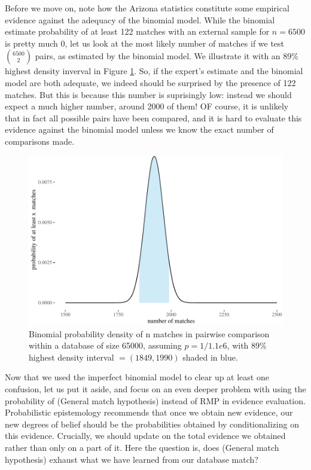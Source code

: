 \documentclass[10pt,dvipsnames,enabledeprecatedfontcommands]{scrartcl}
\begin{document}

Before we move on, note how the Arizona statistics constitute some
empirical evidence against the adequacy of the binomial model. While the
binomial estimate probability of at least 122 matches with an external
sample for \(n=6500\) is pretty much 0, let us look at the most likely
number of matches if we test \({6500 \choose 2}\) pairs, as estimated by
the binomial model. We illustrate it with an 89\% highest density
inverval in Figure \ref{fig:ArizonaDensity}. So, if the expert's
estimate and the binomial model are both adequate, we indeed should be
surprised by the presence of 122 matches. But this is because this
number is suprisingly low: instead we should expect a much higher
number, around 2000 of them! OF course, it is unlikely that in fact all
possible pairs have been compared, and it is hard to evaluate this
evidence against the binomial model unless we know the exact number of
comparisons made.

\begin{figure}[h]

\begin{center}\includegraphics[width=1\linewidth]{lr-chapter3_files/figure-latex/fig:ArizonaDensity-1} \end{center}
\caption{Binomial probability density of  n matches in pairwise comparison within a database of size 65000, assuming $p=1/1.1e6$, with 89\% highest density interval $=(1849,1990)$ shaded in blue.}
\label{fig:ArizonaDensity}
\end{figure}

Now that we used the imperfect binomial model to clear up at least one
confusion, let us put it aside, and focus on an even deeper problem with
using the probability of (General match hypothesis) instead of RMP in
evidence evaluation. Probabilistic epistemology recommends that once we
obtain new evidence, our new degrees of belief should be the
probabilities obtained by conditionalizing on this evidence. Crucially,
we should update on the total evidence we obtained rather than only on a
part of it. Here the question is, does (General match hypothesis)
exhaust what we have learned from our database match?
\end{document}
